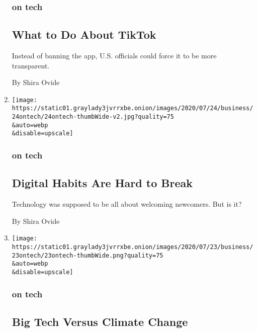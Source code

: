 \begin{enumerate}
  \hypertarget{on-tech-4}{%
  \subsubsection{on tech}\label{on-tech-4}}

  \hypertarget{what-to-do-about-tiktok}{%
  \subsection{What to Do About TikTok}\label{what-to-do-about-tiktok}}

  Instead of banning the app, U.S. officials could force it to be more
  transparent.

  By Shira Ovide
\item
  \href{/2020/07/24/technology/digital-habits.html}{}

  \texttt{[image: https://static01.graylady3jvrrxbe.onion/images/2020/07/24/business/24ontech/24ontech-thumbWide-v2.jpg?quality=75\\\&auto=webp\\\&disable=upscale]}

  \hypertarget{on-tech-5}{%
  \subsubsection{on tech}\label{on-tech-5}}

  \hypertarget{digital-habits-are-hard-to-break}{%
  \subsection{Digital Habits Are Hard to
  Break}\label{digital-habits-are-hard-to-break}}

  Technology was supposed to be all about welcoming newcomers. But is
  it?

  By Shira Ovide
\item
  \href{/2020/07/23/technology/big-tech-climate-change.html}{}

  \texttt{[image: https://static01.graylady3jvrrxbe.onion/images/2020/07/23/business/23ontech/23ontech-thumbWide.png?quality=75\\\&auto=webp\\\&disable=upscale]}

  \hypertarget{on-tech-6}{%
  \subsubsection{on tech}\label{on-tech-6}}

  \hypertarget{big-tech-versus-climate-change}{%
  \subsection{Big Tech Versus Climate
  Change}\label{big-tech-versus-climate-change}}


\end{enumerate}
